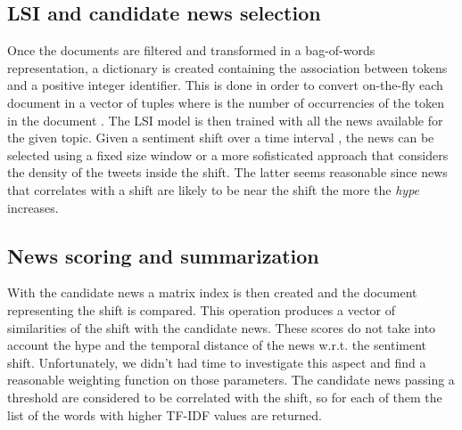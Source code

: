 \subsection{LSI and candidate news selection}
Once the documents are filtered and transformed in a bag-of-words representation, a dictionary is created containing the association between tokens and a positive integer identifier. This is done in order to convert on-the-fly each document  in a vector of tuples  where  is the number of occurrencies of the token  in the document . The LSI model is then trained with all the news available for the given topic. Given a sentiment shift over a time interval \math{[T_b,T_e]}, the news can be selected using a fixed size window \math{[T_b - c,T_e]} or a more sofisticated approach that considers the density of the tweets inside the shift. The latter seems reasonable since news that correlates with a shift are likely to be near the shift the more the \emph{hype} increases.

\subsection{News scoring and summarization}
With the candidate news a matrix index is then created and the document representing the shift is compared. This operation produces a vector of similarities of the shift with the candidate news. These scores do not take into account the hype and the temporal distance of the news w.r.t. the sentiment shift. Unfortunately, we didn't had time to investigate this aspect and find a reasonable weighting function on those parameters. The candidate news passing a threshold are considered to be correlated with the shift, so for each of them the list of the  words with higher TF-IDF values are returned.